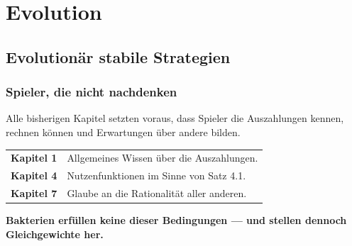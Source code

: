 \part{Evolution}

\chapter{Evolutionär stabile Strategien}

\section{Spieler, die nicht nachdenken}

\begin{merksatz}
Alle bisherigen Kapitel setzten voraus, dass Spieler die Auszahlungen kennen, rechnen können und Erwartungen über andere bilden.

\begin{center}
{\small
\renewcommand{\arraystretch}{1.5}
\begin{tabular}{@{}P{2.4cm}P{6.2cm}@{}}
\toprule
\textbf{Kapitel 1} & Allgemeines Wissen über die Auszahlungen.\\
\textbf{Kapitel 4} & Nutzenfunktionen im Sinne von Satz 4.1.\\
\textbf{Kapitel 7} & Glaube an die Rationalität aller anderen.\\
\bottomrule
\end{tabular}}
\end{center}

\begin{center}
\begin{minipage}{0.9\textwidth}
\textbf{Bakterien erfüllen keine dieser Bedingungen --- und stellen dennoch Gleichgewichte her.}
\end{minipage}
\end{center}

\begin{center}
\begin{minipage}{0.88\textwidth}
\end{minipage}
\end{center}
\end{merksatz}

